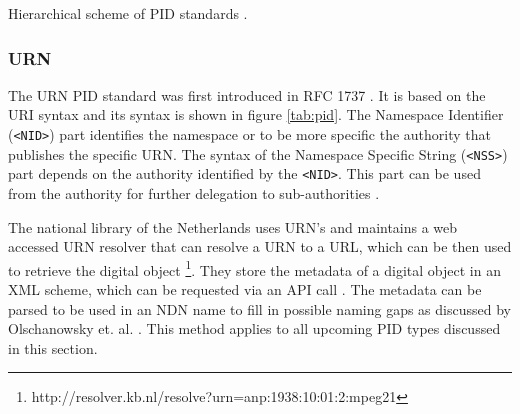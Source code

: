\begin {table}[H]
\caption {Hierarchical scheme of PID standards \cite{icn-bd}.} \label{tab:pid} 
\begin{center}
\end{center}
\end {table}


\subsubsection{URN}
The URN PID standard was first introduced in RFC 1737 \cite{rfc1737}. It is based on the URI syntax and its syntax is shown in figure \ref{tab:pid}. The Namespace Identifier (\texttt{\textless NID\textgreater}) part identifies the namespace or to be more specific the authority that publishes the specific URN.
The syntax of the Namespace Specific String (\texttt{\textless NSS\textgreater}) part depends on the authority identified by the \texttt{\textless NID\textgreater}. This part can be used from the authority for further delegation to sub-authorities \cite{icn-bd}.

The national library of the Netherlands uses URN's and maintains a web accessed URN resolver that can resolve a URN to a URL, which can be then used to retrieve the digital object \footnote{http://resolver.kb.nl/resolve?urn=anp:1938:10:01:2:mpeg21}.
They store the metadata of a digital object in an XML scheme, which can be requested via an API call \cite{kb-urn}. The metadata can be parsed to be used in an NDN name to fill in possible naming gaps as discussed by Olschanowsky et. al. \cite{ndn-clim}. This method applies to all upcoming PID types discussed in this section.

